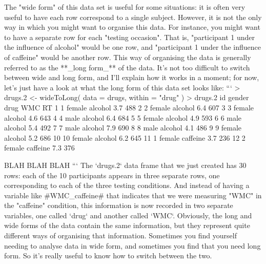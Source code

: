 The "wide form" of this data set is useful for some situations: it is often very useful to have each row correspond to a single subject. However, it is not the only way in which you might want to organise this data. For instance, you might want to have a separate row for each "testing occasion". That is, "participant 1 under the influence of alcohol" would be one row, and "participant 1 under the influence of caffeine" would be another row. This way of organising the data is generally referred to as the **_long form_** of the data. It's not too difficult to switch between wide and long form, and I'll explain how it works in a moment; for now, let's just have a look at what the long form of this data set looks like:
```
> drugs.2 <- wideToLong( data = drugs, within = "drug" )
> drugs.2
   id gender     drug WMC  RT
1   1 female  alcohol 3.7 488
2   2 female  alcohol 6.4 607
3   3 female  alcohol 4.6 643
4   4   male  alcohol 6.4 684
5   5 female  alcohol 4.9 593
6   6   male  alcohol 5.4 492
7   7   male  alcohol 7.9 690
8   8   male  alcohol 4.1 486
9   9 female  alcohol 5.2 686
10 10 female  alcohol 6.2 645
11  1 female caffeine 3.7 236
12  2 female caffeine 7.3 376

BLAH BLAH BLAH
```
The `drugs.2` data frame that we just created has 30 rows: each of the 10 participants appears in three separate rows, one corresponding to each of the three testing conditions. And instead of having a variable like \rtextverb#WMC_caffeine# that indicates that we were measuring "WMC" in the "caffeine" condition, this information is now recorded in two separate variables, one called `drug` and another called `WMC`. Obviously, the long and wide forms of the data contain the same information, but they represent quite different ways of organising that information. Sometimes you find yourself needing to analyse data in wide form, and sometimes you find that you need long form. So it's really useful to know how to switch between the two.

